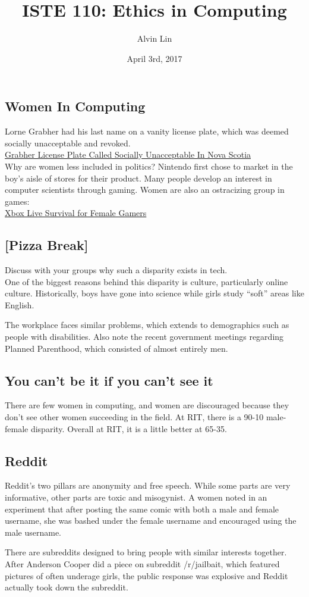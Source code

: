 \documentclass{article}
\title{ISTE 110: Ethics in Computing}
\author{Alvin Lin}
\date{April 3rd, 2017}
\begin{document}
\maketitle

\subsection*{Women In Computing}
Lorne Grabher had his last name on a vanity license plate, which was deemed
socially unacceptable and revoked. \\
\href{http://dailycaller.com/2017/03/25/grabher-license-plate-called-socially-unacceptable-in-nova-scotia/}{Grabher License Plate Called Socially Unacceptable In Nova Scotia} \\
Why are women less included in politics?
Nintendo first chose to market in the boy's aisle of stores for their product.
Many people develop an interest in computer scientists through gaming.
Women are also an ostracizing group in games: \\
\href{https://www.lifewire.com/xbox-live-survival-for-female-gamers-3562487}
{Xbox Live Survival for Female Gamers} \\

\subsection*{[Pizza Break]}
Discuss with your groups why such a disparity exists in tech. \\
One of the biggest reasons behind this disparity is culture, particularly
online culture. Historically, boys have gone into science while girls study
``soft'' areas like English. \par
The workplace faces similar problems, which extends to demographics such as
people with disabilities. Also note the recent government meetings regarding
Planned Parenthood, which consisted of almost entirely men.

\subsection*{You can't be it if you can't see it}
There are few women in computing, and women are discouraged because they don't
see other women succeeding in the field. At RIT, there is a 90-10 male-female
disparity. Overall at RIT, it is a little better at 65-35.

\subsection*{Reddit}
Reddit's two pillars are anonymity and free speech. While some parts are very
informative, other parts are toxic and misogynist. A women noted in an
experiment that after posting the same comic with both a male and female
username, she was bashed under the female username and encouraged using the
male username. \par
There are subreddits designed to bring people with similar interests together.
After Anderson Cooper did a piece on subreddit /r/jailbait, which featured
pictures of often underage girls, the public response was explosive and Reddit
actually took down the subreddit.
\end{document}

